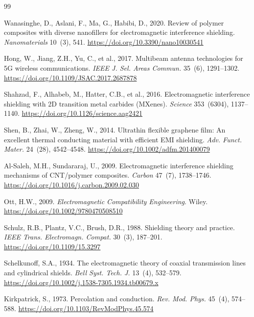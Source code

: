 \documentclass[review,3p,authoryear]{elsarticle}
\begin{document}
\begin{thebibliography}{99}

Wanasinghe, D., Aslani, F., Ma, G., Habibi, D., 2020.
Review of polymer composites with diverse nanofillers for electromagnetic interference shielding.
\textit{Nanomaterials} 10~(3), 541.
\url{https://doi.org/10.3390/nano10030541}

Hong, W., Jiang, Z.H., Yu, C., et al., 2017.
Multibeam antenna technologies for 5G wireless communications.
\textit{IEEE J. Sel. Areas Commun.} 35~(6), 1291--1302.
\url{https://doi.org/10.1109/JSAC.2017.2687878}

Shahzad, F., Alhabeb, M., Hatter, C.B., et al., 2016.
Electromagnetic interference shielding with 2D transition metal carbides (MXenes).
\textit{Science} 353~(6304), 1137--1140.
\url{https://doi.org/10.1126/science.aag2421}

Shen, B., Zhai, W., Zheng, W., 2014.
Ultrathin flexible graphene film: An excellent thermal conducting material with efficient EMI shielding.
\textit{Adv. Funct. Mater.} 24~(28), 4542--4548.
\url{https://doi.org/10.1002/adfm.201400079}

Al-Saleh, M.H., Sundararaj, U., 2009.
Electromagnetic interference shielding mechanisms of CNT/polymer composites.
\textit{Carbon} 47~(7), 1738--1746.
\url{https://doi.org/10.1016/j.carbon.2009.02.030}

Ott, H.W., 2009.
\textit{Electromagnetic Compatibility Engineering}. Wiley.
\url{https://doi.org/10.1002/9780470508510}

Schulz, R.B., Plantz, V.C., Brush, D.R., 1988.
Shielding theory and practice.
\textit{IEEE Trans. Electromagn. Compat.} 30~(3), 187--201.
\url{https://doi.org/10.1109/15.3297}

Schelkunoff, S.A., 1934.
The electromagnetic theory of coaxial transmission lines and cylindrical shields.
\textit{Bell Syst. Tech. J.} 13~(4), 532--579.
\url{https://doi.org/10.1002/j.1538-7305.1934.tb00679.x}

Kirkpatrick, S., 1973.
Percolation and conduction.
\textit{Rev. Mod. Phys.} 45~(4), 574--588.
\url{https://doi.org/10.1103/RevModPhys.45.574}


\end{thebibliography}
\end{document}
